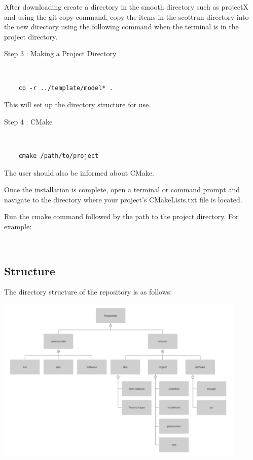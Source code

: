 \documentclass[12pt]{article}
\numberwithin{equation}{section}
\numberwithin{figure}{section}
\begin{document}
After downloading create a directory in the smooth directory such as projectX and using the git copy command, copy the items in the scottrun directory into the new directory using the following command when the terminal is in the project directory.

\begin{description}
\item[Step 3 : Making a Project Directory] 
\end{description}
{\tt 
\begin{verbatim}
    cp -r ../template/model* . 
\end{verbatim}
}
     
This will set up the directory structure for use.  \\ 

\begin{description}
\item[Step 4 : CMake]
\end{description}

{\tt 
\begin{verbatim}
    cmake /path/to/project 
\end{verbatim}
}

The user should also be informed about CMake. 

Once the installation is complete, open a terminal or command prompt and navigate to the directory where your project's CMakeLists.txt file is located.

Run the cmake command followed by the path to the project directory. For example:

\\

\subsection{Structure}

The directory structure of the repository is as follows: 

\includegraphics[width = 120mm]{Structure Tree.png}
\end{document}
